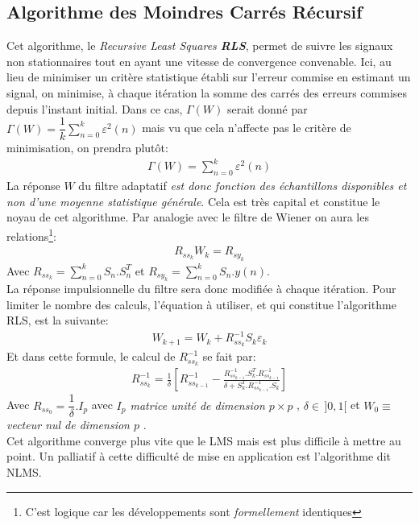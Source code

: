 \subsection{Algorithme des Moindres Carrés Récursif \cite{ThAlaedine, Esiee}}
Cet algorithme, le \emph{Recursive Least Squares \textbf{RLS}}, permet de suivre les signaux non stationnaires tout en ayant une vitesse de convergence convenable. Ici, au lieu de minimiser un critère statistique établi sur l'erreur commise en estimant un signal, on minimise, à chaque itération la somme des carrés des erreurs commises depuis l'instant initial. Dans ce cas, $ \Gamma(W) $ serait donné par\\ $ \Gamma(W) = \dfrac{1}{k}\sum_{n = 0}^{k}\varepsilon^{2}(n) $ mais vu que cela n'affecte pas le critère de minimisation, on prendra plutôt:
\begin{eqnarray}
\Gamma(W) = \sum_{n = 0}^{k}\varepsilon^{2}(n)
\end{eqnarray}
La réponse $ W $ du filtre adaptatif \emph{est donc fonction des échantillons disponibles et non d'une moyenne statistique générale}. Cela est très capital et constitue le noyau de cet algorithme. Par analogie avec le filtre de Wiener on aura les relations\footnote{C'est logique car les développements sont \emph{formellement} identiques}:
\begin{eqnarray}
R_{ss_{k}}W_{k} = R_{sy_{k}}
\end{eqnarray}
Avec $ R_{ss_{k}} = \sum_{n=0}^{k}S_{n}.S_{n}^{T} $ et $ R_{sy_{k}} = \sum_{n=0}^{k}S_{n}.y(n) $.\\
La réponse impulsionnelle du filtre sera donc modifiée à chaque itération. Pour limiter le nombre des calculs, l'équation à utiliser, et qui constitue l'algorithme RLS, est la suivante:
\begin{eqnarray}\label{AlgoRLS}
W_{k+1} = W_{k} + R^{-1}_{ss_{k}}S_{k}\varepsilon_{k}
\end{eqnarray}
Et dans cette formule, le calcul de $ R^{-1}_{ss_{k}} $ se fait par:
\begin{eqnarray}
R^{-1}_{ss_{k}} = \frac{1}{\delta}[R^{-1}_{ss_{k-1}} - \frac{R^{-1}_{ss_{k-1}}.S_{k}^{T}.R^{-1}_{ss_{k-1}}}{\delta + S_{k}^{T}.R^{-1}_{ss_{k-1}}.S_{k}}]
\end{eqnarray}
Avec $ R_{ss_{0}} = \dfrac{1}{\delta}.I_{p}$ avec \emph{$ I_{p} $ matrice unité de dimension $ p\times p $ },  $ \delta \in\, \rbrack 0,1 \lbrack $ et $ W_{0} \equiv $ \emph{vecteur nul de dimension $ p $ }.\\
Cet algorithme converge plus vite que le LMS mais est plus difficile à mettre au point. Un palliatif à cette difficulté de mise en application est l'algorithme dit NLMS.
